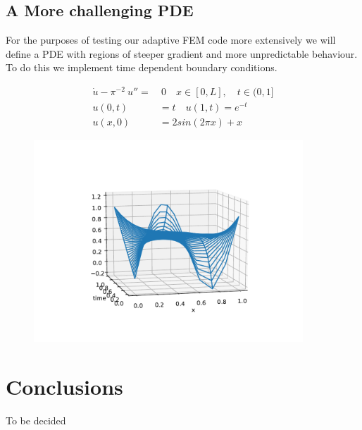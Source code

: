 \documentclass{uonmathreport}
\theoremstyle{definition}
\theoremstyle{problem}
\theoremstyle{theorem}
\begin{document}
\clearpage

\subsection{A More challenging PDE} \label{subsec:time dep boundaries }

For the purposes of testing our adaptive FEM code more extensively we will define a PDE with regions of steeper gradient and more unpredictable behaviour. To do this we implement time dependent boundary conditions.

\begin{subequations} 
\begin{align}\label{eq:time dep boundaries}
  \dot{u} - \pi^{-2} \: u'' = &\: 0 \quad x \in [0, L], \quad t \in (0, 1] \\ 
  u(0, t) & = t  \quad u(1, t) = e^{-t} \\
  u(x, 0) & =  2sin(2 \pi x) +x
\end{align}
\end{subequations}


\begin{figure}[h!]
   \includegraphics[width=0.9\textwidth]{TestFixedMesh.pdf}
   
 \label{fig:IndicatorPDE1}
\end{figure}

\newpage


\section{Conclusions} \label{sec:conclusions}

To be decided

\newpage
\end{document}

